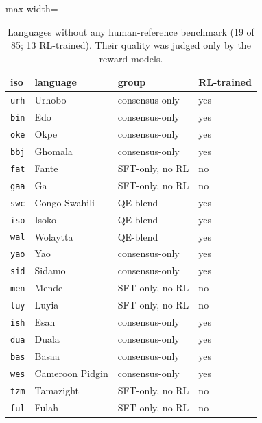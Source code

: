 \begin{table}[t]
\centering
\footnotesize
\setlength{\tabcolsep}{3pt}
\caption{Languages without any human-reference benchmark (19 of 85; 13 RL-trained). Their quality was judged only by the reward models.}
\label{tab:t_nobench}
\begin{adjustbox}{max width=\linewidth}
{\def\LTcaptype{none} %
\begin{tabular}{@{}llll@{}}
\toprule
iso & language & group & RL-trained \\
\midrule
\texttt{urh} & Urhobo & consensus-only & yes \\
\texttt{bin} & Edo & consensus-only & yes \\
\texttt{oke} & Okpe & consensus-only & yes \\
\texttt{bbj} & Ghomala & consensus-only & yes \\
\texttt{fat} & Fante & SFT-only, no RL & no \\
\texttt{gaa} & Ga & SFT-only, no RL & no \\
\texttt{swc} & Congo Swahili & QE-blend & yes \\
\texttt{iso} & Isoko & QE-blend & yes \\
\texttt{wal} & Wolaytta & QE-blend & yes \\
\texttt{yao} & Yao & consensus-only & yes \\
\texttt{sid} & Sidamo & consensus-only & yes \\
\texttt{men} & Mende & SFT-only, no RL & no \\
\texttt{luy} & Luyia & SFT-only, no RL & no \\
\texttt{ish} & Esan & consensus-only & yes \\
\texttt{dua} & Duala & consensus-only & yes \\
\texttt{bas} & Basaa & consensus-only & yes \\
\texttt{wes} & Cameroon Pidgin & consensus-only & yes \\
\texttt{tzm} & Tamazight & SFT-only, no RL & no \\
\texttt{ful} & Fulah & SFT-only, no RL & no \\
\bottomrule
\end{tabular}
}
\end{adjustbox}
\end{table}

